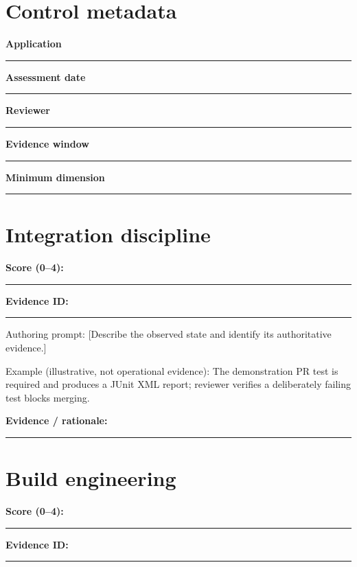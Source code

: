 \documentclass[11pt,letterpaper]{article}
\begin{document}
\makedoctitle\makedocsummary
\section{Control metadata}
\noindent\textbf{Application}\par\nobreak\vspace{6pt}\noindent\rule{0.93\linewidth}{0.4pt}\par\vspace{14pt}
\noindent\textbf{Assessment date}\par\nobreak\vspace{6pt}\noindent\rule{0.93\linewidth}{0.4pt}\par\vspace{14pt}
\noindent\textbf{Reviewer}\par\nobreak\vspace{6pt}\noindent\rule{0.93\linewidth}{0.4pt}\par\vspace{14pt}
\noindent\textbf{Evidence window}\par\nobreak\vspace{6pt}\noindent\rule{0.93\linewidth}{0.4pt}\par\vspace{14pt}
\noindent\textbf{Minimum dimension}\par\nobreak\vspace{6pt}\noindent\rule{0.93\linewidth}{0.4pt}\par\vspace{14pt}
\section{Integration discipline}
\noindent\textbf{Score (0--4):}\rule{2cm}{0.4pt}\quad\textbf{Evidence ID:}\rule{4cm}{0.4pt}

Authoring prompt: [Describe the observed state and identify its authoritative evidence.]

Example (illustrative, not operational evidence): The demonstration PR test is required and produces a JUnit XML report; reviewer verifies a deliberately failing test blocks merging.

\noindent\textbf{Evidence / rationale:}\par\nobreak\vspace{8pt}\noindent\rule{0.93\linewidth}{0.4pt}\par\vspace{14pt}
\section{Build engineering}
\noindent\textbf{Score (0--4):}\rule{2cm}{0.4pt}\quad\textbf{Evidence ID:}\rule{4cm}{0.4pt}
\end{document}

